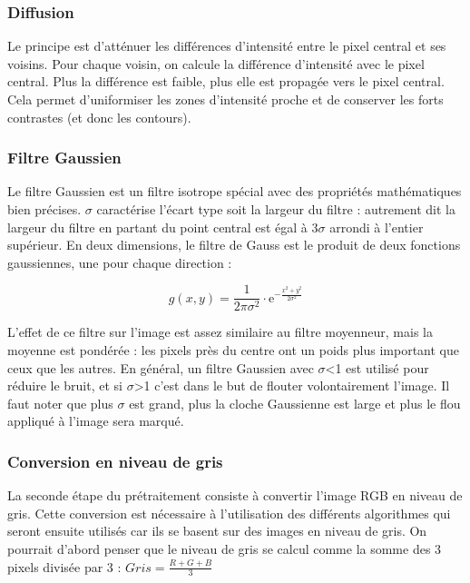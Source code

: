 \subsubsection*{Diffusion}

Le principe est d’atténuer les différences d'intensité entre le pixel central et ses voisins. Pour chaque voisin, on calcule la différence d'intensité avec le pixel central. Plus la différence est faible, plus elle est propagée vers le pixel central. Cela permet d'uniformiser les zones d'intensité proche et de conserver les forts contrastes (et donc les contours).

\subsubsection*{Filtre Gaussien}
\label{FiltreGaussien}

Le filtre Gaussien est un filtre isotrope spécial avec des propriétés mathématiques bien précises. $\sigma$ caractérise l'écart type soit la largeur du filtre : autrement dit la largeur du filtre en partant du point central est égal à 3$\sigma$ arrondi à l'entier supérieur. En deux dimensions, le filtre de Gauss est le produit de deux fonctions gaussiennes, une pour chaque direction :

$$g(x,y) = \frac{1}{2\pi\sigma^2}\cdot \mathrm{e}^{-\frac{x^2+y^2}{2\sigma^2}}$$

L’effet de ce filtre sur l’image est assez similaire au filtre moyenneur, mais la moyenne est pondérée : les pixels près du centre ont un poids plus important que ceux que les autres. En général, un filtre Gaussien avec $\sigma$<1 est utilisé pour réduire le bruit, et si $\sigma$>1 c’est dans le but de flouter volontairement l'image. Il faut noter que plus $\sigma$ est grand, plus la cloche Gaussienne est large et plus le flou appliqué à l’image sera marqué.

\subsubsection{Conversion en niveau de gris}

La seconde étape du prétraitement consiste à convertir l’image RGB en niveau de gris. Cette conversion est nécessaire à l’utilisation des différents algorithmes qui seront ensuite utilisés car ils se basent sur des images en niveau de gris. On pourrait d’abord penser que le niveau de gris se calcul comme la somme des 3 pixels divisée par 3 : $Gris = \frac{R + G + B}{3}$

